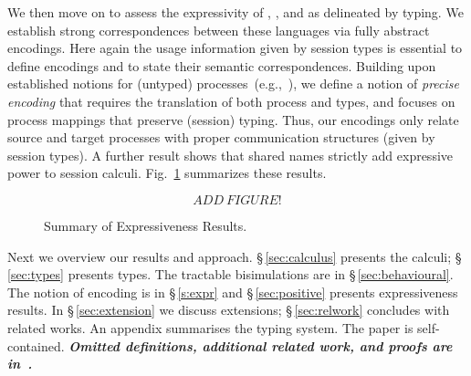 We then move on to 
assess the expressivity 
 of \HOp, \HO, and \sessp as delineated by typing. 
We establish strong correspondences between 
these languages via fully abstract encodings. 
Here again the usage information given by session types is essential to define encodings
and to state their semantic correspondences.
 Building upon established notions for (untyped) processes~(e.g.,~\cite{DBLP:journals/iandc/Gorla10}), 
 we
define a notion of \emph{precise encoding} that 
requires the translation of both process and types, and 
focuses on process mappings that preserve (session) typing. 
Thus, our encodings only relate source and target 
processes 
with  
proper communication structures (given by session types).
A further result shows that 
shared names
 strictly add expressive power 
to session calculi. 
Fig.~\ref{fig:express} summarizes %
these
results.

\begin{figure}[t]
\[
ADD~FIGURE!
\]
\caption{Summary of Expressiveness Results. \label{fig:express}}
\Hline
\end{figure}

\smallskip

Next  we overview our results and approach.
\noi \S\,\ref{sec:calculus} presents the calculi; 
\S\,\ref{sec:types} presents types.
The tractable bisimulations are in \S\,\ref{sec:behavioural}.
The notion of encoding is in \S\,\ref{s:expr} and
\S\,\ref{sec:positive} %
presents expressiveness results.
In \S\,\ref{sec:extension} we discuss extensions; 
\S\,\ref{sec:relwork} concludes with related works.
An appendix summarises the typing system. 
The paper is self-contained. 
{\bf\em Omitted definitions, additional related work, and  proofs 
are 
in~\cite{KouzapasPY15}.} 

